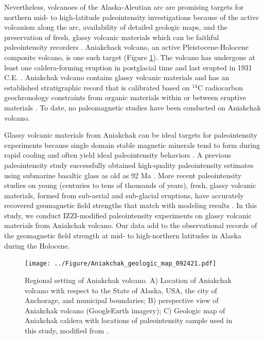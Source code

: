 \documentclass[draft]{agujournal2019}
\begin{document}
Nevertheless, volcanoes of the Alaska-Aleutian arc are promising targets for northern mid- to high-latitude paleointensity investigations because of the active volcanism along the arc, availability of detailed geologic maps, and the preservation of fresh, glassy volcanic materials which can be faithful paleointensity recorders \cite{Cromwell2015a, Cromwell2015b, Cromwell2018a}. Aniakchack volcano, an active Pleistocene-Holocene composite volcano, is one such target (Figure \ref{Geologic_map}). The volcano has undergone at least one caldera-forming eruption in postglacial time and last erupted in 1931 C.E. \cite{Bacon2014a}. Aniakchak volcano contains glassy volcanic materials and has an established stratigraphic record that is calibrated based on $^{14}$C radiocarbon geochronology constraints from organic materials within or between eruptive materials \cite{Bacon2014a}. To date, no paleomagnetic studies have been conducted on Aniakchak volcano. 

Glassy volcanic materials from Aniakchak can be ideal targets for paleointensity experiments because single domain stable magnetic minerals tend to form during rapid cooling and often yield ideal paleointensity behaviors \cite{Tauxe2004a,Dunlop2005a}. A previous paleointensity study successfully obtained high-quality paleointensity estimates using submarine basaltic glass as old as 92 Ma \cite{Tauxe2004a}. More recent paleointensity studies on young (centuries to tens of thousands of years), fresh, glassy volcanic materials, formed from sub-aerial and sub-glacial eruptions, have accurately recovered geomagnetic field strengths that match with modeling results \cite{Cromwell2015a, Cromwell2015b, Cai2017a, Cromwell2018a}. In this study, we conduct IZZI-modified paleointensity experiments \cite{Tauxe2004b} on glassy volcanic materials from Aniakchak volcano. Our data add to the observational records of the geomagnetic field strength at mid- to high-northern latitudes in Alaska during the Holocene.

\begin{figure}
\centering
\noindent\texttt{[image: ../Figure/Aniakchak\_geologic\_map\_092421.pdf]}
\caption{Regional setting of Aniakchak volcano. A) Location of Aniakchak volcano with respect to the State of Alaska, USA, the city of Anchorage, and municipal boundaries; B) perspective view of Aniakchak volcano (GoogleEarth imagery); C) Geologic map of Aniakchak caldera with locations of paleointensity sample used in this study, modified from \protect{}.}
\label{Geologic_map}
\end{figure}
\end{document}
